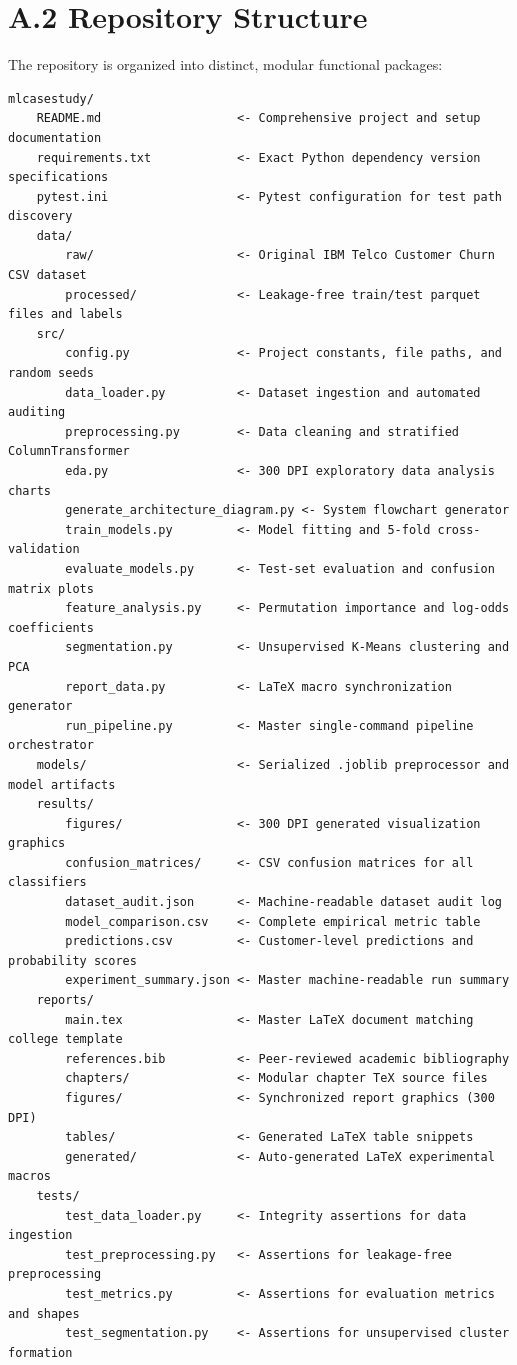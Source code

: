 \section*{A.2 Repository Structure}
The repository is organized into distinct, modular functional packages:
{\footnotesize
\begin{verbatim}
mlcasestudy/
    README.md                   <- Comprehensive project and setup documentation
    requirements.txt            <- Exact Python dependency version specifications
    pytest.ini                  <- Pytest configuration for test path discovery
    data/
        raw/                    <- Original IBM Telco Customer Churn CSV dataset
        processed/              <- Leakage-free train/test parquet files and labels
    src/
        config.py               <- Project constants, file paths, and random seeds
        data_loader.py          <- Dataset ingestion and automated auditing
        preprocessing.py        <- Data cleaning and stratified ColumnTransformer
        eda.py                  <- 300 DPI exploratory data analysis charts
        generate_architecture_diagram.py <- System flowchart generator
        train_models.py         <- Model fitting and 5-fold cross-validation
        evaluate_models.py      <- Test-set evaluation and confusion matrix plots
        feature_analysis.py     <- Permutation importance and log-odds coefficients
        segmentation.py         <- Unsupervised K-Means clustering and PCA
        report_data.py          <- LaTeX macro synchronization generator
        run_pipeline.py         <- Master single-command pipeline orchestrator
    models/                     <- Serialized .joblib preprocessor and model artifacts
    results/
        figures/                <- 300 DPI generated visualization graphics
        confusion_matrices/     <- CSV confusion matrices for all classifiers
        dataset_audit.json      <- Machine-readable dataset audit log
        model_comparison.csv    <- Complete empirical metric table
        predictions.csv         <- Customer-level predictions and probability scores
        experiment_summary.json <- Master machine-readable run summary
    reports/
        main.tex                <- Master LaTeX document matching college template
        references.bib          <- Peer-reviewed academic bibliography
        chapters/               <- Modular chapter TeX source files
        figures/                <- Synchronized report graphics (300 DPI)
        tables/                 <- Generated LaTeX table snippets
        generated/              <- Auto-generated LaTeX experimental macros
    tests/
        test_data_loader.py     <- Integrity assertions for data ingestion
        test_preprocessing.py   <- Assertions for leakage-free preprocessing
        test_metrics.py         <- Assertions for evaluation metrics and shapes
        test_segmentation.py    <- Assertions for unsupervised cluster formation
\end{verbatim}
}

